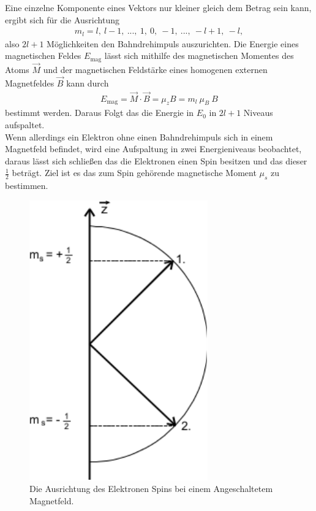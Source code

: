 Eine einzelne Komponente eines Vektors nur kleiner gleich dem Betrag sein kann, ergibt sich für die Ausrichtung
\begin{align}
	m_l = l,\ l-1,\ ...,\ 1,\ 0,\ -1,\ ... ,\ -l+1,\ -l,
\end{align}
also $2l+1 $ Möglichkeiten den Bahndrehimpuls auszurichten. Die Energie eines magnetischen Feldes $E_\text{mag}$ lässt sich mithilfe des magnetischen Momentes des Atoms $\vec{M}$ und der magnetischen Feldstärke eines homogenen externen Magnetfeldes $\vec{B}$ kann durch 
\begin{align}
	E_\text{mag}=\vec{M}\cdot\vec{B}=\mu_zB=m_l\ \mu_B\ B
\end{align}
bestimmt werden. Daraus Folgt das die Energie in $E_0$ in $2l+1$ Niveaus aufspaltet.\\
Wenn allerdings ein Elektron ohne einen Bahndrehimpuls sich in einem Magnetfeld befindet, wird eine Aufspaltung in zwei Energieniveaus beobachtet, daraus lässt sich schließen das die Elektronen einen Spin besitzen und das dieser $\frac{1}{2}$ beträgt. Ziel ist es das zum Spin gehörende magnetische Moment $\mu_s$ zu bestimmen.
\begin{figure}[h!]
\centering
\includegraphics[width=\textwidth/4]{../Grafiken/SpinElektron.pdf}
\caption{Die Ausrichtung des Elektronen Spins bei einem Angeschaltetem Magnetfeld.\cite{V28}}\label{fig:ResonanzTheo}
\end{figure}
